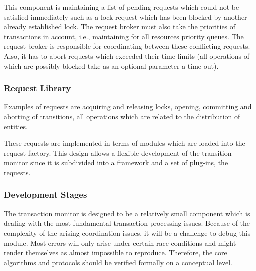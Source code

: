 \documentclass[a4paper, 10pt]{book}
\begin{document}
                                This component is maintaining a list of pending requests which could
                                not be satisfied immediately such as a lock request which has been
                                blocked by another already established lock. The request broker must
                                also take the priorities of transactions in account, i.e., maintaining
                                for all resources priority queues. 
                                The request broker is responsible for coordinating between these
                                conflicting requests. Also, it has to abort requests which exceeded
                                their time-limits (all operations of \SYNEIGHT which are possibly blocked
                                take as an optional parameter a time-out).



                                \subsubsection{Request Library}


                                Examples of requests are acquiring and releasing locks, opening,
                                committing and aborting of transitions, all operations which are
                                related to the distribution of entities.

                                These requests are implemented in terms of modules which are loaded 
                                into the request factory. This design allows a flexible development
                                of the transition monitor since it is subdivided into a framework and
                                a set of plug-ins, the requests. 



                                \subsubsection{Development Stages}
                                \label{sec:development-stages-4}

                                The transaction monitor is designed to be a relatively small component
                                which is dealing with the most fundamental transaction processing
                                issues. Because of the complexity of the arising coordination issues,
                                it will be a challenge to debug this module. Most errors will only
                                arise under certain race conditions and might render themselves as
                                almost impossible to reproduce. Therefore, the core algorithms and
                                protocols should be verified formally on a conceptual level. 
\end{document}

